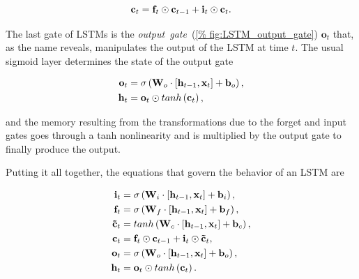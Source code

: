 \begin{equation}\label{eq:LSTM_state_update}
    \mathbf{c}_t = \mathbf{f}_t \odot \mathbf{c}_{t-1} +
        \mathbf{i}_t \odot \mathbf{c}_t.
\end{equation}

The last gate of LSTMs is the \emph{output~gate}~(\autoref{%
fig:LSTM_output_gate}) $\mathbf{o}_t$ that, as the name reveals, manipulates
the output of the LSTM at time $t$. The usual sigmoid layer determines the
state of the output gate

\begin{equation}\label{eq:LSTM_output_gate}
\begin{split}
    \mathbf{o}_t &= \sigma\left(\mathbf{W}_o \cdot \left[\mathbf{h}_{t-1},
        \mathbf{x}_t\right] + \mathbf{b}_o \right),\\
    \mathbf{h}_t &= \mathbf{o}_t \odot tanh \left(\mathbf{c}_t\right),
\end{split}
\end{equation}

\noindent and the memory resulting from the transformations due to the forget and
input gates goes through a tanh nonlinearity and is multiplied by the output
gate to finally produce the output.

Putting it all together, the equations that govern the behavior of an LSTM are

\begin{equation}\label{eq:LSTM}
\begin{split}
    \mathbf{i}_t &= \sigma\left(\mathbf{W}_i \cdot \left[\mathbf{h}_{t-1},
        \mathbf{x}_t\right] + \mathbf{b}_i \right),\\
    \mathbf{f}_t &= \sigma\left(\mathbf{W}_f \cdot \left[\mathbf{h}_{t-1},
        \mathbf{x}_t\right] + \mathbf{b}_f \right),\\
    \mathbf{\tilde c}_t &= tanh \left(\mathbf{W}_c \cdot
        \left[\mathbf{h}_{t-1}, \mathbf{x}_t\right] + \mathbf{b}_c \right),\\
    \mathbf{c}_t &= \mathbf{f}_t \odot \mathbf{c}_{t-1} + \mathbf{i}_t
        \odot \mathbf{\tilde c}_t,\\
    \mathbf{o}_t &= \sigma\left(\mathbf{W}_o \cdot \left[\mathbf{h}_{t-1},
        \mathbf{x}_t\right] + \mathbf{b}_o \right),\\
    \mathbf{h}_t &= \mathbf{o}_t \odot tanh \left(\mathbf{c}_t\right).
\end{split}
\end{equation}


